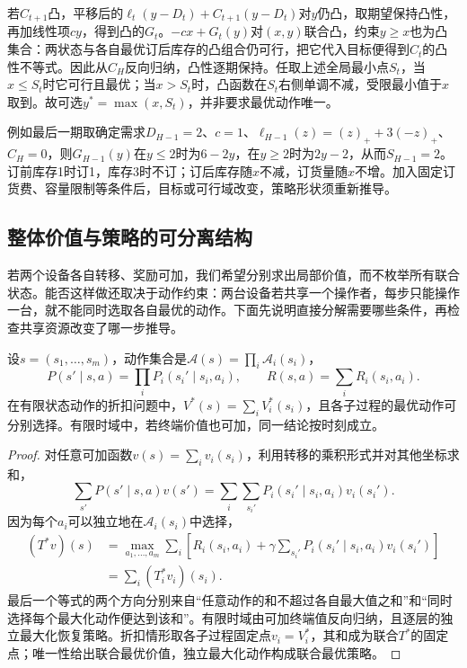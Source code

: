 若$C_{t+1}$凸，平移后的$\ell_t(y-D_t)+C_{t+1}(y-D_t)$对$y$仍凸，取期望保持凸性，再加线性项$cy$，得到凸的$G_t$。$-cx+G_t(y)$对$(x,y)$联合凸，约束$y\geq x$也为凸集合：两状态与各自最优订后库存的凸组合仍可行，把它代入目标便得到$C_t$的凸性不等式。因此从$C_H$反向归纳，凸性逐期保持。任取上述全局最小点$S_t$，当$x\leq S_t$时它可行且最优；当$x>S_t$时，凸函数在$S_t$右侧单调不减，受限最小值于$x$取到。故可选$y^*=\max(x,S_t)$，并非要求最优动作唯一。

例如最后一期取确定需求$D_{H-1}=2$、$c=1$、$\ell_{H-1}(z)=(z)_++3(-z)_+$、$C_H=0$，则$G_{H-1}(y)$在$y\leq2$时为$6-2y$，在$y\geq2$时为$2y-2$，从而$S_{H-1}=2$。订前库存1时订1，库存3时不订；订后库存随$x$不减，订货量随$x$不增。加入固定订货费、容量限制等条件后，目标或可行域改变，策略形状须重新推导。

\subsection{整体价值与策略的可分离结构}
\label{sec:rl-planning-separable}

若两个设备各自转移、奖励可加，我们希望分别求出局部价值，而不枚举所有联合状态。能否这样做还取决于动作约束：两台设备若共享一个操作者，每步只能操作一台，就不能同时选取各自最优的动作。下面先说明直接分解需要哪些条件，再检查共享资源改变了哪一步推导。

\begin{theorem}[独立子过程的可分离性]
 \label{thm:rl-planning-separable}
 设$s=(s_1,\ldots,s_m)$，动作集合是$\mathcal A(s)=\prod_i\mathcal A_i(s_i)$，
 \[
 P(s'\mid s,a)=\prod_iP_i(s_i'\mid s_i,a_i),\qquad
 R(s,a)=\sum_iR_i(s_i,a_i).
 \]
 在有限状态动作的折扣问题中，$V^*(s)=\sum_iV_i^*(s_i)$，且各子过程的最优动作可分别选择。有限时域中，若终端价值也可加，同一结论按时刻成立。
\end{theorem}
\begin{proof}
 对任意可加函数$v(s)=\sum_i v_i(s_i)$，利用转移的乘积形式并对其他坐标求和，
 \[
 \sum_{s'}P(s'\mid s,a)v(s')
 =\sum_i\sum_{s_i'}P_i(s_i'\mid s_i,a_i)v_i(s_i').
 \]
 因为每个$a_i$可以独立地在$\mathcal A_i(s_i)$中选择，
 \[
 \begin{aligned}
 (T^*v)(s)
 &=\max_{a_1,\ldots,a_m}\sum_i
   \left[R_i(s_i,a_i)+\gamma\sum_{s_i'}P_i(s_i'\mid s_i,a_i)v_i(s_i')\right]\\
 &=\sum_i(T_i^*v_i)(s_i).
 \end{aligned}
 \]
 最后一个等式的两个方向分别来自“任意动作的和不超过各自最大值之和”和“同时选择每个最大化动作便达到该和”。有限时域由可加终端值反向归纳，且逐层的独立最大化恢复策略。折扣情形取各子过程固定点$v_i=V_i^*$，其和成为联合$T^*$的固定点；唯一性给出联合最优价值，独立最大化动作构成联合最优策略。
\end{proof}

